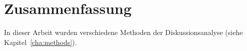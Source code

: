 \chapter{Zusammenfassung}
In dieser Arbeit wurden verschiedene Methoden der Diskussionsanalyse  (siehe Kapitel~\ref{cha:methods}).

